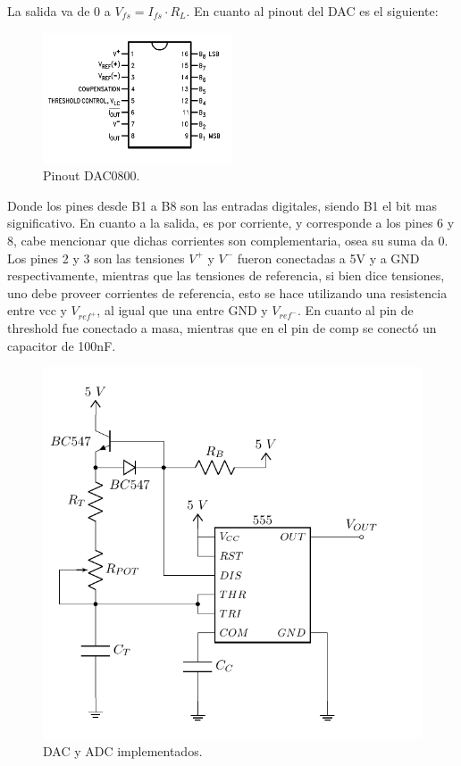 La salida va de 0 a $V_{fs}= I_{fs} \cdot R_L$. En cuanto al pinout del DAC es el siguiente:
\begin{figure}[H]
	\centering
	\includegraphics[width=0.5\textwidth]{ImagenesEjercicio1/dacpinout.png}
\caption{Pinout DAC0800.}
	\label{fig:dapinout}
\end{figure}
Donde los pines desde B1 a B8 son las entradas digitales, siendo B1 el bit mas significativo. En cuanto a la salida, es por corriente, y corresponde a los pines 6 y 8, cabe mencionar que dichas corrientes son complementaria, osea su suma da 0. Los pines 2 y 3 son las tensiones $V^+$ y $V^-$ fueron conectadas a 5V y a GND respectivamente, mientras que las tensiones de referencia, si bien dice tensiones, uno debe proveer corrientes de referencia, esto se hace utilizando una resistencia entre vcc y $V_{ref^+}$, al igual que una entre GND y $V_{ref^-}$. En cuanto al pin de threshold fue conectado a masa, mientras que en el pin de comp se conectó un capacitor de 100nF.

\begin{figure}[H]
\centering
\includegraphics[width=\linewidth, page = 2]{ImagenesEjercicio1/Components.pdf}
\caption{DAC y ADC implementados.}
\label{fig:dacydac}
\end{figure}

